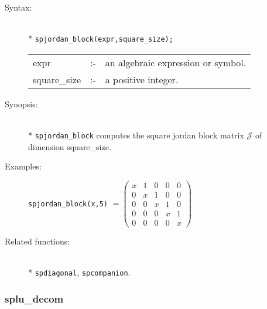 \begin{description}
\item[Syntax:]\mbox{}\\*
 \texttt{spjordan\_block(expr,square\_size);}\\[2mm]
\begin{tabular}{l l l}
expr        &:-& an algebraic expression or symbol. \\
square\_size &:-& a positive integer.
\end{tabular}

\item[Synopsis:]\mbox{}\\*
\texttt{spjordan\_block} computes the square jordan block matrix $\mathcal{J}$
                of dimension square\_size.

\item[Examples:]
\begin{flushleft}
\texttt{spjordan\_block(x,5)} \( =
\begin{pmatrix} x & 1 & 0 & 0 & 0 \\ 0 & x & 1 & 0 & 0 \\ 0
& 0 & x & 1 & 0 \\ 0 & 0 & 0 & x & 1 \\ 0 & 0 & 0 & 0 & x
\end{pmatrix}
\)
\end{flushleft}

\item[Related functions:]\mbox{}\\*
 \texttt{spdiagonal}, \texttt{spcompanion}.
\end{description}

\subsubsection{splu\_decom}
\label{sparse:splu_decom}

